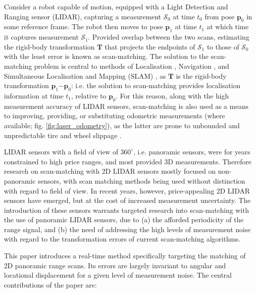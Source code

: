 Consider a robot capable of motion, equipped with a Light Detection and Ranging
sensor (LIDAR), capturing a measurement $\mathcal{S}_0$ at time $t_0$ from pose
$\bm{p}_0$ in some reference frame. The robot then moves to pose $\bm{p}_1$ at
time $t_1$ at which time it captures measurement $\mathcal{S}_1$. Provided
overlap between the two scans, estimating the rigid-body transformation
$\bm{T}$ that projects the endpoints of $\mathcal{S}_1$ to those of
$\mathcal{S}_0$ with the least error is known as scan-matching. The solution to
the scan-matching problem is central to methods of Localisation
\cite{Ju2019}, Navigation
\cite{Kumar2018}, and Simultaneous
Localisation and Mapping (SLAM) \cite{Zhang2019,Pedrosa2020}, as
$\bm{T}$ is the rigid-body transformation $\bm{p}_1$$-$$\bm{p}_0$: i.e. the
solution to scan-matching provides localisation information at time $t_1$,
relative to $\bm{p}_0$. For this reason, along with the high measurement
accuracy of LIDAR sensors, scan-matching is also used as a means to improving,
providing, or substituting odometric measurements (where available; fig.
\ref{fig:laser_odometry}), as the latter are prone to unbounded and
unpredictable tire and wheel slippage \cite{Olson2009,Zhang2020}.

LIDAR sensors with a field of view of $360^\circ$, i.e. panoramic sensors, were
for years constrained to high price ranges, and most provided 3D measurements.
Therefore research on scan-matching with 2D LIDAR sensors mostly focused on
non-panoramic sensors, with scan matching methods being used without distinction
with regard to field of view. In recent years, however, price-appealing
2D LIDAR sensors have emerged, but at the cost of increased measurement
uncertainty. The introduction of these sensors warrants targeted research
into scan-matching with the use of panoramic LIDAR sensors, due to (a) the
afforded periodicity of the range signal, and (b) the need of
addressing the high levels of measurement noise with regard to the
transformation errors of current scan-matching algorithms.

This paper introduces a real-time method specifically targeting the matching of
2D panoramic range scans. Its errors are largely invariant to angular and
locational displacement for a given level of measurement noise. The central
contributions of the paper are:

